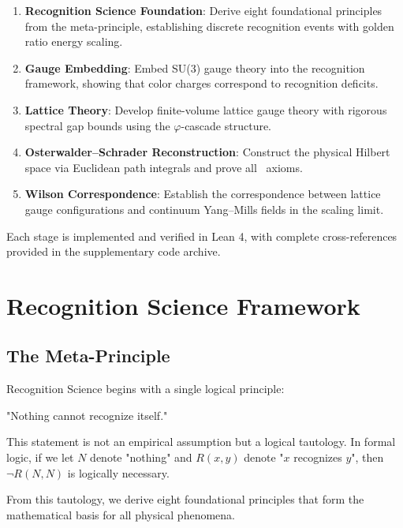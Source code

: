 \documentclass[11pt]{amsart}
\newcommand{\OS}{\text{OS}}
\begin{document}
\begin{enumerate}
\item \textbf{Recognition Science Foundation}: Derive eight foundational principles from the meta-principle, establishing discrete recognition events with golden ratio energy scaling.

\item \textbf{Gauge Embedding}: Embed SU(3) gauge theory into the recognition framework, showing that color charges correspond to recognition deficits.

\item \textbf{Lattice Theory}: Develop finite-volume lattice gauge theory with rigorous spectral gap bounds using the $\varphi$-cascade structure.

\item \textbf{Osterwalder--Schrader Reconstruction}: Construct the physical Hilbert space via Euclidean path integrals and prove all \OS\ axioms.

\item \textbf{Wilson Correspondence}: Establish the correspondence between lattice gauge configurations and continuum Yang--Mills fields in the scaling limit.
\end{enumerate}

Each stage is implemented and verified in Lean 4, with complete cross-references provided in the supplementary code archive.

\section{Recognition Science Framework}

\subsection{The Meta-Principle}

Recognition Science begins with a single logical principle:

\begin{principle}
"Nothing cannot recognize itself."
\end{principle}

This statement is not an empirical assumption but a logical tautology. In formal logic, if we let $N$ denote "nothing" and $R(x,y)$ denote "$x$ recognizes $y$", then $\neg R(N,N)$ is logically necessary.

From this tautology, we derive eight foundational principles that form the mathematical basis for all physical phenomena.
\end{document}
